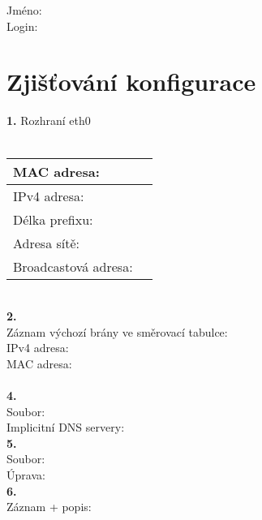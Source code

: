 Jméno:\\
Login:\\

\section{Zjišťování konfigurace}
\textbf{1.} Rozhraní eth0\\
\\
\begin{tabular}{|l|r|}
\hline
MAC adresa: & \hspace{12em} \\
\hline
IPv4 adresa: & \hspace{12em} \\
\hline
Délka prefixu: & \\
\hline
Adresa sítě: & \\
\hline
Broadcastová adresa: & \\
\hline
\end{tabular}
\vspace{1.5em}
\\
\textbf{2.}\\
\vspace{3em}
Záznam výchozí brány ve směrovací tabulce:\\
IPv4 adresa:\\
MAC adresa:\\
\\
\textbf{4.}\\
Soubor:\\
\vspace{8em}
Implicitní DNS servery:\\
\textbf{5.}\\
Soubor:\\
\vspace{4em}
Úprava:\\
\noindent
\textbf{6.}\\
\vspace{5em}
Záznam + popis:\\
\noindent

